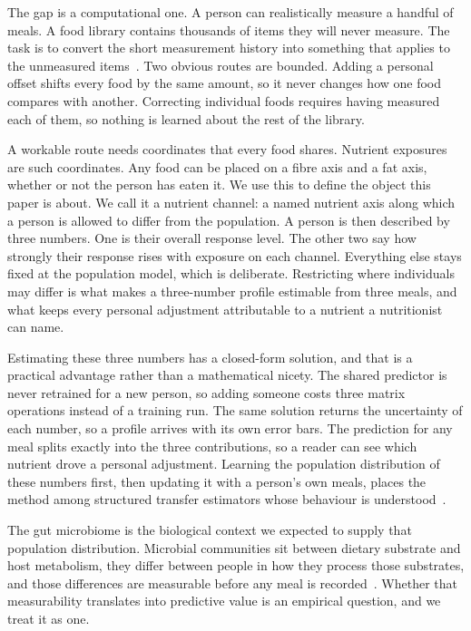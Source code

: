 \documentclass[pdflatex,sn-nature]{sn-jnl}
\theoremstyle{thmstyleone}
\theoremstyle{thmstyletwo}
\theoremstyle{thmstylethree}
\begin{document}
The gap is a computational one. A person can realistically measure a handful of meals. A food library contains thousands of items they will never measure. The task is to convert the short measurement history into something that applies to the unmeasured items~\cite{computationalnutrition2025,massara2026}. Two obvious routes are bounded. Adding a personal offset shifts every food by the same amount, so it never changes how one food compares with another. Correcting individual foods requires having measured each of them, so nothing is learned about the rest of the library.

A workable route needs coordinates that every food shares. Nutrient exposures are such coordinates. Any food can be placed on a fibre axis and a fat axis, whether or not the person has eaten it. We use this to define the object this paper is about. We call it a nutrient channel: a named nutrient axis along which a person is allowed to differ from the population. A person is then described by three numbers. One is their overall response level. The other two say how strongly their response rises with exposure on each channel. Everything else stays fixed at the population model, which is deliberate. Restricting where individuals may differ is what makes a three-number profile estimable from three meals, and what keeps every personal adjustment attributable to a nutrient a nutritionist can name.

Estimating these three numbers has a closed-form solution, and that is a practical advantage rather than a mathematical nicety. The shared predictor is never retrained for a new person, so adding someone costs three matrix operations instead of a training run. The same solution returns the uncertainty of each number, so a profile arrives with its own error bars. The prediction for any meal splits exactly into the three contributions, so a reader can see which nutrient drove a personal adjustment. Learning the population distribution of these numbers first, then updating it with a person's own meals, places the method among structured transfer estimators whose behaviour is understood~\cite{dvcm2026,contextadaptive2026,harrison2020,grant2018,finn2017}.

The gut microbiome is the biological context we expected to supply that population distribution. Microbial communities sit between dietary substrate and host metabolism, they differ between people in how they process those substrates, and those differences are measurable before any meal is recorded~\cite{sanz2025,koh,makki,gurry_fermentation2021}. Whether that measurability translates into predictive value is an empirical question, and we treat it as one.
\end{document}
